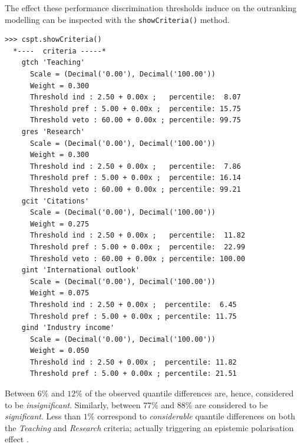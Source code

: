 The effect these performance discrimination thresholds induce on the outranking modelling can be inspected with the \texttt{showCriteria()} method.
\begin{lstlisting}[caption={Inspecting the performance discrimination thresholds},label=list:13.6]
>>> cspt.showCriteria()
  *----  criteria -----*
    gtch 'Teaching'
      Scale = (Decimal('0.00'), Decimal('100.00'))
      Weight = 0.300 
      Threshold ind : 2.50 + 0.00x ;   percentile:  8.07
      Threshold pref : 5.00 + 0.00x ;  percentile: 15.75
      Threshold veto : 60.00 + 0.00x ; percentile: 99.75
    gres 'Research'
      Scale = (Decimal('0.00'), Decimal('100.00'))
      Weight = 0.300 
      Threshold ind : 2.50 + 0.00x ;   percentile:  7.86
      Threshold pref : 5.00 + 0.00x ;  percentile: 16.14
      Threshold veto : 60.00 + 0.00x ; percentile: 99.21
    gcit 'Citations'
      Scale = (Decimal('0.00'), Decimal('100.00'))
      Weight = 0.275 
      Threshold ind : 2.50 + 0.00x ;   percentile:  11.82
      Threshold pref : 5.00 + 0.00x ;  percentile:  22.99
      Threshold veto : 60.00 + 0.00x ; percentile: 100.00
    gint 'International outlook'
      Scale = (Decimal('0.00'), Decimal('100.00'))
      Weight = 0.075 
      Threshold ind : 2.50 + 0.00x ;  percentile:  6.45
      Threshold pref : 5.00 + 0.00x ; percentile: 11.75
    gind 'Industry income'
      Scale = (Decimal('0.00'), Decimal('100.00'))
      Weight = 0.050 
      Threshold ind : 2.50 + 0.00x ;  percentile: 11.82
      Threshold pref : 5.00 + 0.00x ; percentile: 21.51
\end{lstlisting}

Between $6\%$ and $12\%$ of the observed quantile differences are, hence, considered to be \emph{insignificant}. Similarly, between $77\%$ and $88\%$ are considered to be \emph{significant}. Less than $1\%$ correspond to \emph{considerable} quantile differences on both the \emph{Teaching} and \emph{Research} criteria; actually triggering an epistemic polarisation effect \citep{BIS-2013}.

